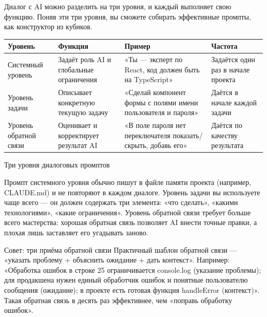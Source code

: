 


Диалог с AI можно разделить на три уровня, и каждый выполняет свою функцию. Поняв эти три уровня, вы сможете собирать эффективные промпты, как конструктор из кубиков.

\begin{center}
\begin{tabularx}{\linewidth}{|X|X|X|X|}
\hline
\textbf{Уровень} & \textbf{Функция} & \textbf{Пример} & \textbf{Частота} \tabularnewline
\hline
Системный уровень & Задаёт роль AI и глобальные ограничения & «Ты — эксперт по React, код должен быть на TypeScript» & Задаётся один раз в начале проекта \tabularnewline
Уровень задачи & Описывает конкретную текущую задачу & «Сделай компонент формы с полями имени пользователя и пароля» & Даётся в начале каждой задачи \tabularnewline
Уровень обратной связи & Оценивает и корректирует результат AI & «В поле пароля нет переключателя показать/скрыть, добавь его» & Даётся по качеству результата \tabularnewline
\hline
\end{tabularx}
\end{center}

\begin{center}\small\color{gray}Три уровня диалоговых промптов\end{center}

Промпт системного уровня обычно пишут в файле памяти проекта (например, CLAUDE.md) и не повторяют в каждом диалоге. Уровень задачи вы используете чаще всего — он должен содержать три элемента: «что сделать», «какими технологиями», «какие ограничения». Уровень обратной связи требует больше всего мастерства: хорошая обратная связь позволяет AI внести точные правки, а плохая лишь заставляет его угадывать заново.

\begin{tcbinfo}{Совет: три приёма обратной связи}
Практичный шаблон обратной связи — «указать проблему + объяснить ожидание + дать контекст». Например: «Обработка ошибок в строке 25 ограничивается console.log (указание проблемы); для продакшена нужен единый обработчик ошибок и понятные пользователю сообщения (ожидание); в проекте есть готовая функция handleError (контекст)». Такая обратная связь в десять раз эффективнее, чем «поправь обработку ошибок».

\end{tcbinfo}

